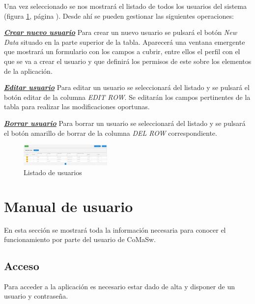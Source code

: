 Una vez seleccionado se nos mostrará el listado de todos los usuarios del sistema (figura
\ref{fig:listado-usuarios}, página \pageref{fig:listado-usuarios}). Desde ahí se pueden gestionar las siguientes operaciones:\newline


\underline{\textsl{\textbf{Crear nuevo usuario}}}
Para crear un nuevo usuario se pulsará el botón \emph{New Data} situado en la parte superior de la tabla. Aparecerá una ventana emergente que mostrará un formulario con los campos a cubrir, entre ellos el perfil con el que se va a crear el usuario y que definirá los permisos de este sobre los elementos de la aplicación.


\underline{\textsl{\textbf{Editar usuario}}}
Para editar un usuario se seleccionará del listado y se pulsará el botón editar de la columna \emph{EDIT ROW}. Se editarán los campos pertinentes de la tabla para realizar las modificaciones oportunas. 

\underline{\textsl{\textbf{Borrar usuario}}}
Para borrar un usuario se seleccionará del listado y se pulsará el botón amarillo de borrar de la columna \emph{DEL ROW} correspondiente.\newline


\begin{figure}[H]
  \centering
  \includegraphics[width=0.40\textwidth]{imaxes/gestion-usuarios-02.png}
  \caption{Listado de usuarios}
  \label{fig:listado-usuarios}
\end{figure}



\section{Manual de usuario}
\label{sec:manual-usuario}

En esta sección se mostrará toda la información necesaria para conocer el funcionamiento por parte del usuario de CoMaSw.


\subsection{Acceso}

Para acceder a la aplicación es necesario estar dado de alta y disponer de un
usuario y contraseña.

